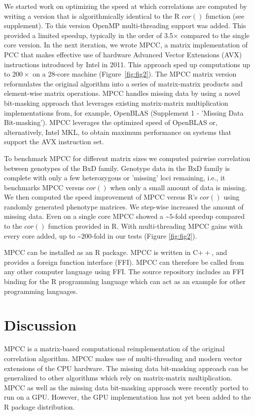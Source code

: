 \documentclass{bioinfo}
\begin{document}
We started work on optimizing the speed at which correlations are computed 
by writing a version that is algorithmically identical to the R $cor()$ function
(see supplement). To this version OpenMP multi-threading support was added. 
This provided a limited speedup, typically in the order of
3.5$\times$ compared to the single core version. In the next iteration, 
we wrote MPCC, a matrix implementation of PCC that makes effective
use of hardware Advanced Vector Extensions (AVX) instructions
introduced by Intel in 2011. This approach sped up computations up to
$200\times$ on a 28-core machine (Figure~\ref{fig:fig2}). The MPCC
matrix version reformulates the original algorithm into a series of
matrix-matrix products and element-wise matrix operations. MPCC
handles missing data by using a novel bit-masking approach that
leverages existing matrix-matrix multiplication implementations from,
for example, OpenBLAS (Supplement 1 - 'Missing Data Bit-masking').
MPCC leverages the optimized speed of OpenBLAS or, alternatively,
Intel\textregistered{} MKL, to obtain maximum performance on systems
that support the AVX instruction set.

To benchmark MPCC for different matrix sizes we computed pairwise
correlation between genotypes of the BxD family.  Genotype data in the
BxD family is complete with only a few heterozygous or 'missing' loci
remaining, i.e., it benchmarks MPCC versus $cor()$ when only a small amount
of data is missing. We then computed the speed improvement of MPCC
versus R's $cor()$ using randomly generated phenotype matrices. We step-wise 
increased the amount of missing data. Even on a single core MPCC showed 
a \textasciitilde{}$5$-fold speedup compared to the $cor()$
function provided in R. With multi-threading MPCC gains with every 
core added, up to \textasciitilde{}$200$-fold in our tests (Figure \ref{fig:fig2}).

MPCC can be installed as an R package. MPCC is written in C$++$, and
provides a foreign function interface (FFI). MPCC can therefore be
called from any other computer language using FFI. The source
repository includes an FFI binding for the R programming language
which can act as an example for other programming languages.

\vspace*{2mm}
\section{Discussion}

MPCC is a matrix-based computational reimplementation of the original
correlation algorithm. MPCC makes use of multi-threading and modern
vector extensions of the CPU hardware.  The missing data bit-masking
approach can be generalized to other algorithms which rely on
matrix-matrix multiplication. MPCC as well as the missing data 
bit-masking approach were recently ported to run on a GPU. However, 
the GPU implementation has not yet been added to the R package distribution.
\end{document}

